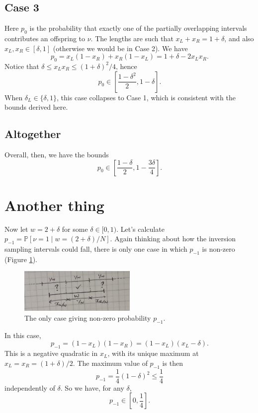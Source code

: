 \documentclass[fleqn]{article}
\newcommand{\Prob}{\mathbb{P}}
\begin{document}
\subsection*{Case 3}
Here $p_0$ is the probability that exactly one of the partially overlapping intervals contributes an offspring to $\nu$. 
The lengths are such that $x_L + x_R = 1+\delta$, and also $x_L, x_R \in [\delta,1]$ (otherwise we would be in Case 2).
We have
\begin{equation}
p_0 
= x_L(1-x_R) + x_R(1-x_L)
= 1 + \delta - 2x_Lx_R .
\end{equation}
Notice that $\delta \leq x_Lx_R \leq (1+\delta)^2/4$, hence
\begin{equation}
p_0 \in \left[ \frac{1-\delta^2}{2}, 1-\delta \right] .
\end{equation}
When $\delta_L \in \{\delta, 1 \}$, this case collapses to Case 1, which is consistent with the bounds derived here.

\subsection*{Altogether}
Overall, then, we have the bounds
\begin{equation}
p_0 \in \left[ \frac{1-\delta}{2}, 1- \frac{3\delta}{4} \right] .
\end{equation}


\section*{Another thing}
Now let $w= 2+\delta$ for some $\delta \in [0,1)$.
Let's calculate $p_{-1} = \Prob[ \nu = 1 \mid w = (2+\delta)/N ]$.
Again thinking about how the inversion sampling intervals could fall, there is only one case in which $p_{-1}$ is non-zero (Figure \ref{fig:cases2}).
\begin{figure}[ht]
\centering
\includegraphics[width=0.5\textwidth]{cases2_sketch.jpg}
\caption{The only case giving non-zero probability $p_{-1}$.}
\label{fig:cases2}
\end{figure}
In this case,
\begin{equation}
p_{-1} 
= (1-x_L)(1-x_R)
= (1-x_L)(x_L - \delta) .
\end{equation}
This is a negative quadratic in $x_L$, with its unique maximum at $x_L=x_R= (1+\delta)/2$.
The maximum value of $p_{-1}$ is then
\begin{equation}
p_{-1}
= \frac{1}{4} (1 - \delta)^2
\leq \frac{1}{4}
\end{equation}
independently of $\delta$.
So we have, for any $\delta$,
\begin{equation}
p_{-1} \in \left[ 0, \frac{1}{4} \right] .
\end{equation}
\end{document}
